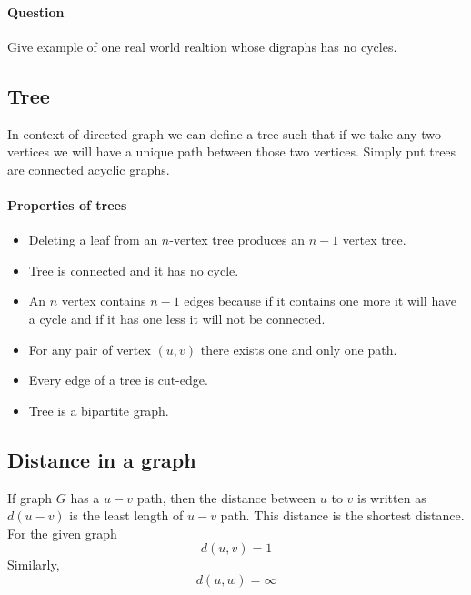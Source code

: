 \paragraph{Question}Give example of one real world realtion whose digraphs has no cycles.


\subsection{Tree}
In context of directed graph we can define a tree such that if we take any two vertices we will have a unique path between those two vertices. Simply put trees are connected acyclic graphs.


\paragraph{Properties of trees}\begin{itemize}
    \item Deleting a leaf from an $n$-vertex tree produces an $n-1$ vertex tree.
    \item Tree is connected and it has no cycle.
    \item An $n$ vertex contains $n-1$ edges because if it contains one more it will have a cycle and if it has one less it will not be connected. 
    \item For any pair of vertex $(u, v)$ there exists one and only one path.
    \item Every edge of a tree is cut-edge.
    \item Tree is a bipartite graph.
\end{itemize}


\subsection{Distance in a graph}
If graph $G$ has a $u-v$ path, then the distance between $u$ to $v$ is written as $d(u-v)$ is the least length of $u-v$ path. This distance is the shortest distance. For the given graph
\begin{equation}
    {\textstyle d(u,v) = 1} 
 \end{equation}
Similarly,
\begin{equation}
    {\textstyle d(u,w) = \infty} 
 \end{equation}

